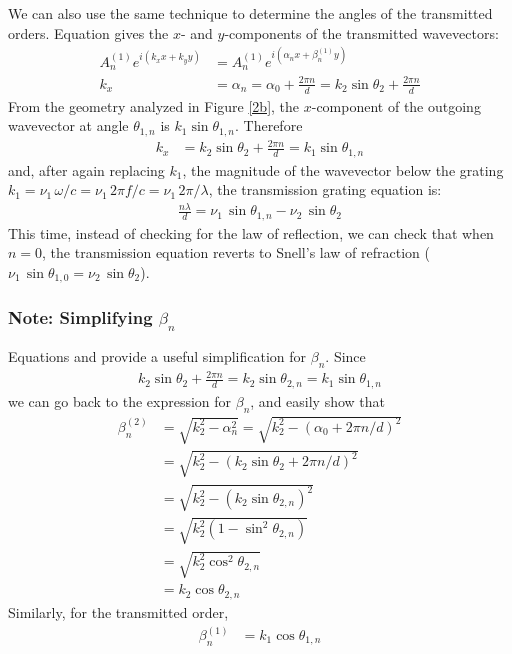 We can also use the same technique to determine the angles of the transmitted orders.  Equation  gives the $x$- and $y$-components of the transmitted wavevectors:
\begin{align}
A^{(1)}_n e^{i(k_x x + k_y y)} &= A^{(1)}_n e^{i(\alpha_n x + \beta^{(1)}_n y)} \\
k_x &= \alpha_n = \alpha_0 + \frac{ 2\pi n}{d} = k_2 \sin \theta_2 +\frac{ 2\pi n}{d}
\end{align}
From the geometry analyzed in Figure \ref{2b}, the $x$-component of the outgoing wavevector at angle $\theta_{1,n}$ is $k_1 \sin \theta_{1,n}$.  Therefore
\begin{align}
\label{kxEqn1}
k_x &= k_2 \sin \theta_2 +\frac{ 2\pi n}{d} = k_1 \sin \theta_{1,n}
\end{align}
and, after again replacing $k_1$, the magnitude of the wavevector below the grating $k_1 = \nu_1\, \omega / c = \nu_1 \, 2\pi f / c =  \nu_1 \, 2\pi / \lambda$, the transmission grating equation is:
\begin{align}
\label{gratingEquation}
\frac{n \lambda}{d} = \nu_1 \, \sin \theta_{1,n} -  \nu_2 \, \sin \theta_{2}
\end{align}
This time, instead of checking for the law of reflection, we can check that when $n=0$, the transmission equation reverts to Snell's law of refraction ($\nu_1\, \sin \theta_{1,0} = \nu_2 \, \sin \theta_2$).

\subsubsection{Note: Simplifying $\beta_n$}
Equations  and  provide a useful simplification for $\beta_n$.  Since 
\begin{align}
k_2 \sin \theta_2 +\frac{ 2\pi n}{d} = k_2 \sin \theta_{2,n} = k_1 \sin \theta_{1,n}
\end{align}
we can go back to the expression for $\beta_n$, and easily show that 
\begin{align}
\beta_n^{(2)} &= \sqrt{k_2^2 - \alpha_n^2} = \sqrt{k_2^2 - (\alpha_0 +2\pi n/d)^2} \\
&= \sqrt{k_2^2 - (k_2 \sin \theta_2 +2\pi n/d)^2}\\
&= \sqrt{ k_2^2 - (k_2 \sin \theta_{2,n})^2 }\\
&= \sqrt{ k_2^2 (1 - \sin^2 \theta_{2,n})}\\
&= \sqrt{ k_2^2 \cos^2 \theta_{2,n} }\\
&= k_2 \cos \theta_{2,n}
\end{align}
Similarly, for the transmitted order,
\begin{align}
\beta_n^{(1)} &= k_1 \cos \theta_{1,n}
\end{align}

